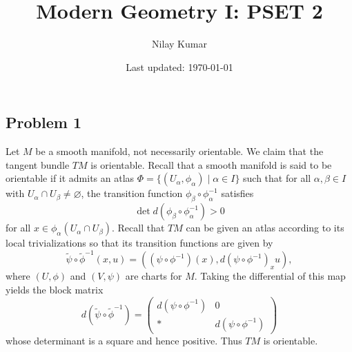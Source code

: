 \documentclass{../mathnotes}
\title{Modern Geometry I: PSET 2}
\author{Nilay Kumar}
\date{Last updated: \today}
\begin{document}
\maketitle

\subsection*{Problem 1}
Let $M$ be a smooth manifold, not necessarily orientable. We claim that the tangent bundle $TM$
is orientable. Recall that a smooth manifold is said to be orientable if it admits an atlas
$\Phi=\{(U_\alpha,\phi_\alpha)\mid\alpha\in I\}$ such that for all $\alpha,\beta\in I$ with
$U_\alpha\cap U_\beta\neq\varnothing$, the transition function $\phi_\beta\circ\phi_\alpha^{-1}$
satisfies
\[\det d(\phi_\beta\circ\phi_\alpha^{-1})>0\]
for all $x\in\phi_\alpha(U_\alpha\cap U_\beta)$. Recall that $TM$ can be given an atlas according
to its local trivializations so that its transition functions are given by
\[\tilde\psi\circ\tilde\phi^{-1}(x,u)=\left( (\psi\circ\phi^{-1})(x),d(\psi\circ\phi^{-1})_xu \right),\]
where $(U,\phi)$ and $(V,\psi)$ are charts for $M$. Taking the differential of this map yields the
block matrix
\begin{equation*}
    d(\tilde\psi\circ\tilde\phi^{-1})=
    \begin{pmatrix}
        d(\psi\circ\phi^{-1}) & 0\\
        * & d(\psi\circ\phi^{-1}) 
    \end{pmatrix}
\end{equation*}
whose determinant is a square and hence positive. Thus $TM$ is orientable.
\end{document}

